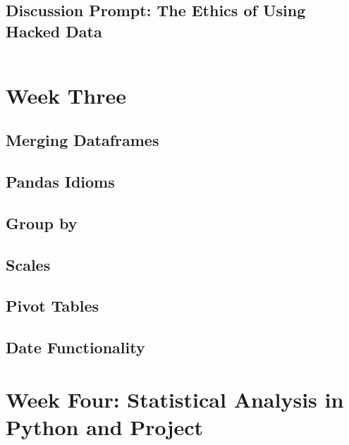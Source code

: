 \documentclass[11pt]{article}
\begin{document}
    \subsection{Discussion Prompt: The Ethics of Using Hacked Data}
    \begin{lstlisting}
    \end{lstlisting}

































\newpage
\section{Week Three}

    \subsection{Merging Dataframes}
    \subsection{Pandas Idioms}
    \subsection{Group by}
    \subsection{Scales}
    \subsection{Pivot Tables}
    \subsection{Date Functionality}




\newpage
\section{Week Four: Statistical Analysis in Python and Project}
\end{document}
